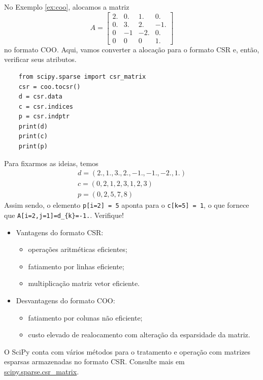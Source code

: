 \begin{ex}
  No Exemplo \ref{ex:coo}, alocamos a matriz
  \begin{equation}
    A =
    \begin{bmatrix}
      2. & 0. & 1.  & 0. \\
      0. & 3. & 2.  & -1.\\
      0  & -1 & -2. & 0. \\
      0  & 0  & 0   & 1.
    \end{bmatrix}
  \end{equation}
  no formato COO. Aqui, vamos converter a alocação para o formato CSR e, então, verificar seus atributos.
  \begin{lstlisting}
    from scipy.sparse import csr_matrix
    csr = coo.tocsr()
    d = csr.data
    c = csr.indices
    p = csr.indptr
    print(d)
    print(c)
    print(p)
  \end{lstlisting}
  Para fixarmos as ideias, temos
  \begin{gather}
    d = (2., 1., 3., 2., -1., -1., -2., 1.)\\
    c = (0, 2, 1, 2, 3, 1, 2, 3)\\
    p = (0, 2, 5, 7, 8)
  \end{gather}
  Assim sendo, o elemento \lstinline+p[i=2] = 5+ aponta para o \lstinline+c[k=5] = 1+, o que fornece que \lstinline+A[i=2,j=1]=d_{k}=-1.+. Verifique!
\end{ex}

\begin{itemize}
\item Vantagens do formato CSR:
  \begin{itemize}
  \item operações aritméticas eficientes;
  \item fatiamento por linhas eficiente;
  \item multiplicação matriz vetor eficiente.
  \end{itemize}
\item Desvantagens do formato COO:
  \begin{itemize}
  \item fatiamento por colunas não eficiente;
  \item custo elevado de realocamento com alteração da esparsidade da matriz.
  \end{itemize}
\end{itemize}

\begin{obs}
  O SciPy conta com vários métodos para o tratamento e operação com matrizes esparsas armazenadas no formato CSR. Consulte mais em \href{https://docs.scipy.org/doc/scipy/reference/generated/scipy.sparse.csr_matrix.html}{scipy.sparse.csr\_matrix}.
\end{obs}

